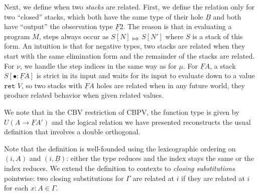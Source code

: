 \documentclass[acmsmall,nonacm]{acmart}
\renewcommand{\u}{\underline}
\newcommand{\bigstepsin}[1]{\mathrel{\Mapsto^{#1}}}
\newcommand{\bigstepany}{\bigstepsin{}}
\newcommand{\kw}[1]{\texttt{#1}\,\,}
\newcommand{\ret}{\kw{ret}}
\begin{document}
{\begin{longonly}
Next, we define when two \emph{stacks} are related.
%
First, we define the relation only for two ``closed'' stacks, which 
both have the same type of their hole $\u B$ and both have
``output'' the observation type $\u F 2$.
%
The reason is that in evaluating a program $M$, steps always occur as
$S[N] \bigstepany S[N']$ where $S$ is a stack of this form.
%
An intuition is that for negative types, two stacks are related when
they start with the same elimination form and the remainder of the
stacks are related.
%
For $\nu$, we handle the step indices in the same way as for $\mu$.
%
For $\u F A$, a stack $S[\bullet : \u F A]$ is strict in its input and
waits for its input to evaluate down to a value $\ret V$, so two
stacks with $\u F A$ holes are related when in any future world, they
produce related behavior when given related values.

We note that in the CBV restriction of CBPV, the function type is
given by $U(A \to \u F A')$ and the logical relation we have presented
reconstructs the usual definition that involves a double orthogonal.

Note that the definition is well-founded using the lexicographic
ordering on $(i, A)$ and $(i, \u B)$: either the type reduces and the
index stays the same or the index reduces.
%
We extend the definition to contexts to \emph{closing substitutions}
pointwise: two closing substitutions for $\Gamma$ are related at $i$
if they are related at $i$ for each $x:A \in \Gamma$.
\end{longonly}

}
\end{document}
